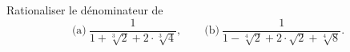 Rationaliser le dénominateur de
\[ \text{(a)}\ \frac{1}{1 + \sqrt[3]{2} + 2 \cdot \sqrt[3]{4}},\qquad \text{(b)}\ \frac{1}{1 - \sqrt[4]{2} + 2 \cdot \sqrt{2} + \sqrt[4]{8}}. \]
